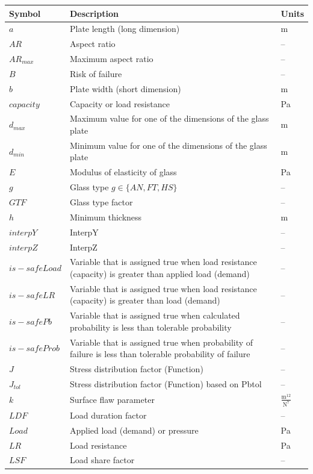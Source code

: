 \documentclass[12pt]{article}
\begin{document}
\begin{longtabu}{l X[l] l}
\toprule
\textbf{Symbol} & \textbf{Description} & \textbf{Units}
\\
\midrule
\endhead
$a$ & Plate length (long dimension) & m
\\
$AR$ & Aspect ratio & --
\\
${AR_{max}}$ & Maximum aspect ratio & --
\\
$B$ & Risk of failure & --
\\
$b$ & Plate width (short dimension) & m
\\
$capacity$ & Capacity or load resistance & Pa
\\
${d_{max}}$ & Maximum value for one of the dimensions of the glass plate & m
\\
${d_{min}}$ & Minimum value for one of the dimensions of the glass plate & m
\\
$E$ & Modulus of elasticity of glass & Pa
\\
$g$ & Glass type $g\in{}\{AN,FT,HS\}$ & --
\\
$GTF$ & Glass type factor & --
\\
$h$ & Minimum thickness & m
\\
$interpY$ & InterpY & --
\\
$interpZ$ & InterpZ & --
\\
$is-safeLoad$ & Variable that is assigned true when load resistance (capacity) is greater than applied load (demand) & --
\\
$is-safeLR$ & Variable that is assigned true when load resistance (capacity) is greater than load (demand) & --
\\
$is-safePb$ & Variable that is assigned true when calculated probability is less than tolerable probability & --
\\
$is-safeProb$ & Variable that is assigned true when probability of failure is less than tolerable probability of failure & --
\\
$J$ & Stress distribution factor (Function) & --
\\
${J_{tol}}$ & Stress distribution factor (Function) based on Pbtol & --
\\
$k$ & Surface flaw parameter & $\frac{\text{m}^{12}}{\text{N}^{7}}$
\\
$LDF$ & Load duration factor & --
\\
$Load$ & Applied load (demand) or pressure & Pa
\\
$LR$ & Load resistance & Pa
\\
$LSF$ & Load share factor & --
\\

\end{longtabu}
\end{document}
